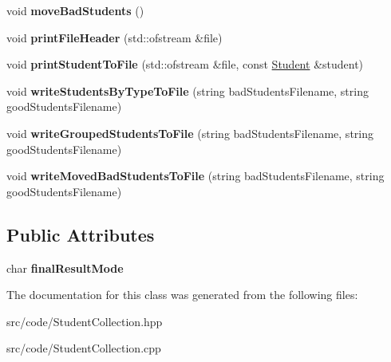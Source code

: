 \begin{DoxyCompactItemize}
\mbox{\label{class_student_collection_a7a877fdeef2cf0c785f257bbd3f425ac}} 
void {\bfseries move\+Bad\+Students} ()
\item 
\mbox{\label{class_student_collection_a8fcb6ca48251e3292e6c621c33edb687}} 
void {\bfseries print\+File\+Header} (std\+::ofstream \&file)
\item 
\mbox{\label{class_student_collection_a3235f164a3173c3e04d7e03b31555c78}} 
void {\bfseries print\+Student\+To\+File} (std\+::ofstream \&file, const \mbox{\hyperlink{class_student}{Student}} \&student)
\item 
\mbox{\label{class_student_collection_ad7a1b18f6dc494b82544a38ea67beda1}} 
void {\bfseries write\+Students\+By\+Type\+To\+File} (string bad\+Students\+Filename, string good\+Students\+Filename)
\item 
\mbox{\label{class_student_collection_ad996524698897e4fd5b55ed702bdfff0}} 
void {\bfseries write\+Grouped\+Students\+To\+File} (string bad\+Students\+Filename, string good\+Students\+Filename)
\item 
\mbox{\label{class_student_collection_a19c1f583bf585de7bcbf45b1870a603a}} 
void {\bfseries write\+Moved\+Bad\+Students\+To\+File} (string bad\+Students\+Filename, string good\+Students\+Filename)
\end{DoxyCompactItemize}
\subsection*{Public Attributes}
\begin{DoxyCompactItemize}
\item 
\mbox{\label{class_student_collection_ae3e0a71d115c469667cc7e645cd38f73}} 
char {\bfseries final\+Result\+Mode}
\end{DoxyCompactItemize}


The documentation for this class was generated from the following files\+:\begin{DoxyCompactItemize}
\item 
src/code/Student\+Collection.\+hpp\item 
src/code/Student\+Collection.\+cpp\end{DoxyCompactItemize}
